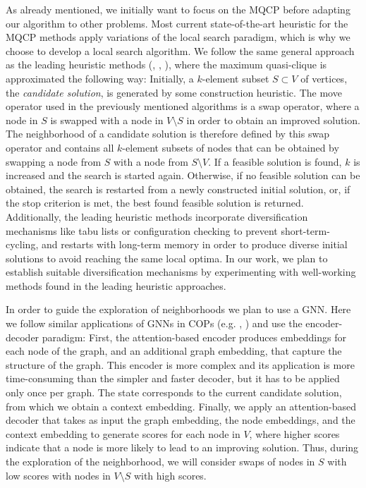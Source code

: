 \documentclass[11pt]{article}
\begin{document}
As already mentioned, we initially want to focus on the MQCP before adapting our algorithm to other problems. Most current state-of-the-art heuristic for the MQCP methods apply variations of the local search paradigm, which is why we choose to develop a local search algorithm. We follow the same general approach as the leading heuristic methods (\cite{djeddi_extension_2019}, \cite{zhou_opposition-based_2020}, \cite{chen_nuqclq_2021}), where the maximum quasi-clique is approximated the following way: Initially, a $k$-element subset $S \subset V$ of vertices, the \textit{candidate solution}, is generated by some construction heuristic. The move operator used in the previously mentioned algorithms is a swap operator, where a node in $S$ is swapped with a node in $V \setminus S$ in order to obtain an improved solution. The neighborhood of a candidate solution is therefore defined by this swap operator and contains all $k$-element subsets of nodes that can be obtained by swapping a node from $S$ with a node from $S \setminus V$. If a feasible solution is found, $k$ is increased and the search is started again. Otherwise, if no feasible solution can be obtained, the search is restarted from a newly constructed initial solution, or, if the stop criterion is met, the best found feasible solution is returned. Additionally, the leading heuristic methods incorporate diversification mechanisms like tabu lists or configuration checking to prevent short-term-cycling, and restarts with long-term memory in order to produce diverse initial solutions to avoid reaching the same local optima. In our work, we plan to establish suitable diversification mechanisms by experimenting with well-working methods found in the leading heuristic approaches. 

In order to guide the exploration of neighborhoods we plan to use a GNN. Here we follow similar applications of GNNs in COPs (e.g. \cite{Kool2019}, \cite{Hudson2021}) and use the encoder-decoder paradigm: First, the attention-based encoder produces embeddings for each node of the graph, and an additional graph embedding, that capture the structure of the graph. This encoder is more complex and its application is more time-consuming than the simpler and faster decoder, but it has to be applied only once per graph. The state corresponds to the current candidate solution, from which we obtain a context embedding. Finally, we apply an attention-based decoder that takes as input the graph embedding, the node embeddings, and the context embedding to generate scores for each node in $V$, where higher scores indicate that a node is more likely to lead to an improving solution. Thus, during the exploration of the neighborhood, we will consider swaps of nodes in $S$ with low scores with nodes in $V \setminus S$ with high scores. 
\end{document}
